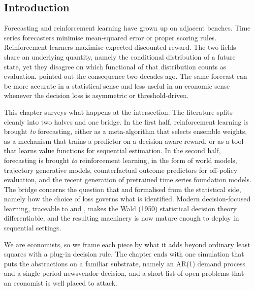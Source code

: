 \subsection{Introduction}
\label{sec:forecasting_rl_intro}

Forecasting and reinforcement learning have grown up on adjacent benches. Time series
forecasters minimise mean-squared error or proper scoring rules. Reinforcement
learners maximise expected discounted reward. The two fields share an underlying
quantity, namely the conditional distribution of a future state, yet they disagree on
which functional of that distribution counts as evaluation. \citet{GrangerPesaran2000}
pointed out the consequence two decades ago. The same forecast can be more accurate
in a statistical sense and less useful in an economic sense whenever the decision
loss is asymmetric or threshold-driven.

This chapter surveys what happens at the intersection. The literature splits cleanly
into two halves and one bridge. In the first half, reinforcement learning is brought
\emph{to} forecasting, either as a meta-algorithm that selects ensemble weights, as a
mechanism that trains a predictor on a decision-aware reward, or as a tool that learns
value functions for sequential estimation. In the second half, forecasting is brought
\emph{to} reinforcement learning, in the form of world models, trajectory generative
models, counterfactual outcome predictors for off-policy evaluation, and the recent
generation of pretrained time series foundation models. The bridge concerns the
question that \citet{GrangerPesaran2000} and \citet{GneitingRaftery2007} formalised
from the statistical side, namely how the choice of loss governs what is identified.
Modern decision-focused learning, traceable to \citet{ElmachtoubGrigas2022} and
\citet{DontiAmosKolter2017}, makes the Wald (1950) statistical decision theory
differentiable, and the resulting machinery is now mature enough to deploy in
sequential settings.

We are economists, so we frame each piece by what it adds beyond ordinary least
squares with a plug-in decision rule. The chapter ends with one simulation that puts
the abstractions on a familiar substrate, namely an AR(1) demand process and a
single-period newsvendor decision, and a short list of open problems that an
economist is well placed to attack.
